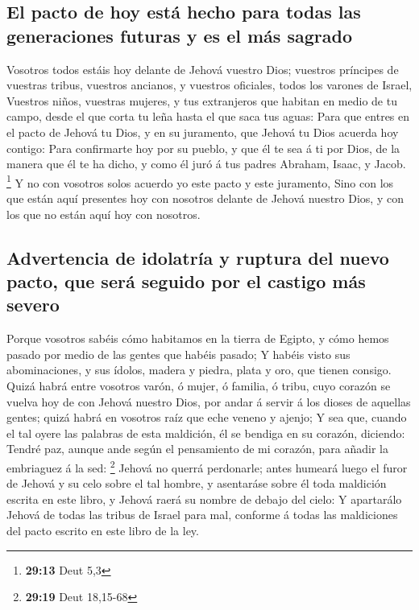 \hypertarget{el-pacto-de-hoy-estuxe1-hecho-para-todas-las-generaciones-futuras-y-es-el-muxe1s-sagrado}{%
\subsection{El pacto de hoy está hecho para todas las generaciones
futuras y es el más
sagrado}\label{el-pacto-de-hoy-estuxe1-hecho-para-todas-las-generaciones-futuras-y-es-el-muxe1s-sagrado}}

 Vosotros todos estáis hoy delante de Jehová vuestro Dios;
vuestros príncipes de vuestras tribus, vuestros ancianos, y vuestros
oficiales, todos los varones de Israel,  Vuestros niños,
vuestras mujeres, y tus extranjeros que habitan en medio de tu campo,
desde el que corta tu leña hasta el que saca tus aguas: 
Para que entres en el pacto de Jehová tu Dios, y en su juramento, que
Jehová tu Dios acuerda hoy contigo:  Para confirmarte hoy
por su pueblo, y que él te sea á ti por Dios, de la manera que él te ha
dicho, y como él juró á tus padres Abraham, Isaac, y Jacob. \footnote{\textbf{29:13}
  Deut 5,3}  Y no con vosotros solos acuerdo yo este pacto
y este juramento,  Sino con los que están aquí presentes
hoy con nosotros delante de Jehová nuestro Dios, y con los que no están
aquí hoy con nosotros.

\hypertarget{advertencia-de-idolatruxeda-y-ruptura-del-nuevo-pacto-que-seruxe1-seguido-por-el-castigo-muxe1s-severo}{%
\subsection{Advertencia de idolatría y ruptura del nuevo pacto, que será
seguido por el castigo más
severo}\label{advertencia-de-idolatruxeda-y-ruptura-del-nuevo-pacto-que-seruxe1-seguido-por-el-castigo-muxe1s-severo}}

 Porque vosotros sabéis cómo habitamos en la tierra de
Egipto, y cómo hemos pasado por medio de las gentes que habéis pasado;
 Y habéis visto sus abominaciones, y sus ídolos, madera y
piedra, plata y oro, que tienen consigo.  Quizá habrá entre
vosotros varón, ó mujer, ó familia, ó tribu, cuyo corazón se vuelva hoy
de con Jehová nuestro Dios, por andar á servir á los dioses de aquellas
gentes; quizá habrá en vosotros raíz que eche veneno y ajenjo;
 Y sea que, cuando el tal oyere las palabras de esta
maldición, él se bendiga en su corazón, diciendo: Tendré paz, aunque
ande según el pensamiento de mi corazón, para añadir la embriaguez á la
sed: \footnote{\textbf{29:19} Deut 18,15-68}  Jehová no
querrá perdonarle; antes humeará luego el furor de Jehová y su celo
sobre el tal hombre, y asentaráse sobre él toda maldición escrita en
este libro, y Jehová raerá su nombre de debajo del cielo: 
Y apartarálo Jehová de todas las tribus de Israel para mal, conforme á
todas las maldiciones del pacto escrito en este libro de la ley.

